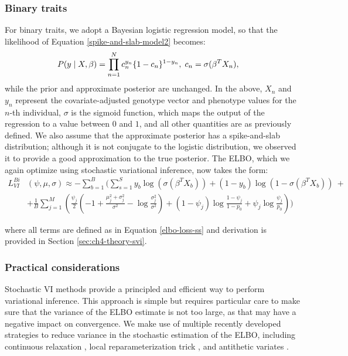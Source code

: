 \subsubsection{Binary traits}
%
For binary traits, we adopt a Bayesian logistic regression model, so that the likelihood of Equation \ref{spike-and-slab-model2} becomes:
\begin{align}
    P(y \mid X, \beta) &= \prod_{n=1}^{N} c_n^{y_n} \{1 - c_n\}^{1-y_n}, \hspace{1mm} c_n = \sigma(\beta^T X_n),
    \label{spike-and-slab-model3}
\end{align}
while the prior and approximate posterior are unchanged.
%
In the above, $X_n$ and $y_n$ represent the covariate-adjusted genotype vector and phenotype values for the $n$-th individual, $\sigma$ is the sigmoid function, which maps the output of the regression to a value between $0$ and $1$, and all other quantities are as previously defined.
%
We also assume that the approximate posterior has a spike-and-slab distribution; although it is not conjugate to the logistic distribution, we observed it to provide a good approximation to the true posterior.
%
The ELBO, which we again optimize using stochastic variational inference, now takes the form: 
\begin{align}
    L^{Bi}_{VI}&(\psi, \mu, \sigma) \approx - \sum\limits^{B}_{b=1} \Bigg( \sum\limits^{S}_{s=1} y_b \log(\sigma(\beta^T X_b)) + (1-y_b)\log(1-\sigma(\beta^T X_b)) \nonumber \ + \\
    &+ \frac{1}{B}\sum\limits^{M}_{j=1} \left(  \frac{\psi_j}{2}\left(-1 + \frac{\mu_j^2 + \sigma_j^2}{\sigma^2} - \log \frac{\sigma_j^2}{\sigma^2} \right) + (1-\psi_j)\log\frac{1 - \psi_j}{1 - p_0} + \psi_j\log\frac{\psi_j}{p_0} \right) \Bigg)
\end{align}

where all terms are defined as in Equation \ref{elbo-loss-ss} and derivation is provided in Section \ref{sec:ch4-theory-svi}.

\subsubsection{Practical considerations}
Stochastic VI methods provide a principled and efficient way to perform variational inference.
%
This approach is simple but requires particular care to make sure that the variance of the ELBO estimate is not too large, as that may have a negative impact on convergence.
%
We make use of multiple recently developed strategies to reduce variance in the stochastic estimation of the ELBO, including continuous relaxation \cite{maddison2016concrete,jang2016categorical}, local reparameterization trick \cite{kingma2015variational}, and antithetic variates \cite{hammersley1956new}.

